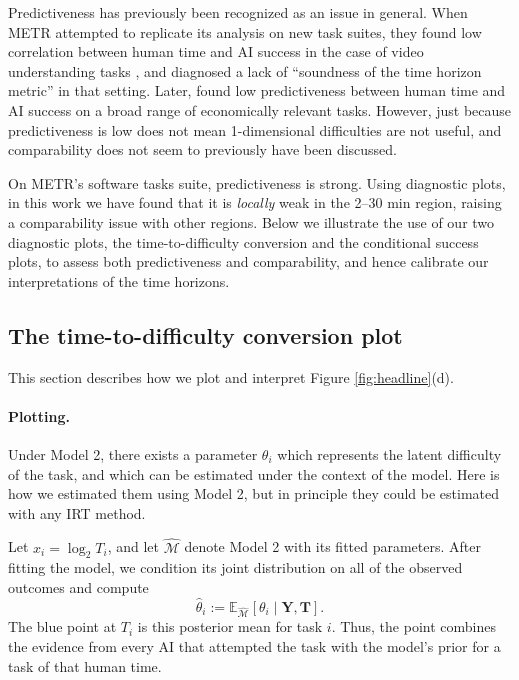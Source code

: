 \documentclass{article}
\theoremstyle{definition}
\begin{document}
Predictiveness has previously been recognized as an issue in general. When METR attempted to replicate its analysis on new task suites, they found low correlation between human time and AI success in the case of video understanding tasks \citep{HowDoesTime2025}, and diagnosed a lack of ``soundness of the time horizon metric'' in that setting. Later, \citet{mertensCrashingWavesVs2026a} found low predictiveness between human time and AI success on a broad range of economically relevant tasks. However, just because predictiveness is low does not mean 1-dimensional difficulties are not useful, and comparability does not seem to previously have been discussed. 

On METR's software tasks suite, predictiveness is strong. Using diagnostic plots, in this work we have found that it is \emph{locally} weak in the 2--30 min region, raising a comparability issue with other regions. Below we illustrate the use of our two diagnostic plots, the time-to-difficulty conversion and the conditional success plots, to assess both predictiveness and comparability, and hence calibrate our interpretations of the time horizons. 

\subsection{The time-to-difficulty conversion plot}\label{sec:diagnosedifficulty}

This section describes how we plot and interpret Figure \ref{fig:headline}(d). 

\paragraph{Plotting.} Under Model 2, there exists a parameter $\theta_i$ which represents the latent difficulty of the task, and which can be estimated under the context of the model. Here is how we estimated them using Model 2, but in principle they could be estimated with any IRT method. 

Let $x_i = \log_2 T_i$, and let $\widehat{\mathcal M}$ denote Model 2 with its fitted parameters. After fitting the model, we condition its joint distribution on all of the observed outcomes and compute
\[
    \hat\theta_i
    := \mathbb{E}_{\widehat{\mathcal M}}
       \left[\theta_i \mid \mathbf{Y}, \mathbf{T}\right].
\]
The blue point at $T_i$ is this posterior mean for task $i$. Thus, the point combines the evidence from every AI that attempted the task with the model's prior for a task of that human time.
\end{document}
